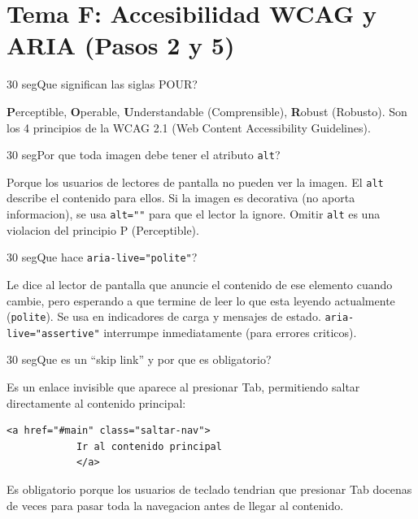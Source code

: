 \documentclass[11pt,a4paper]{article}
\newcounter{nej}
\newcommand{\ej}[2]{%
	\stepcounter{nej}%
	\begin{ejercicio}{\arabic{nej}}{#1}#2\end{ejercicio}\vspace{4pt}}
\begin{document}
	\section{Tema F: Accesibilidad WCAG y ARIA (Pasos 2 y 5)}
	
	\ej{30 seg}{Que significan las siglas POUR?}
	
	\begin{respuesta}
		\textbf{P}erceptible, \textbf{O}perable, \textbf{U}nderstandable (Comprensible), \textbf{R}obust (Robusto). Son los 4 principios de la WCAG 2.1 (Web Content Accessibility Guidelines).
	\end{respuesta}
	\vspace{6pt}
	
	\ej{30 seg}{Por que toda imagen debe tener el atributo \texttt{alt}?}
	
	\begin{respuesta}
		Porque los usuarios de lectores de pantalla no pueden ver la imagen. El \texttt{alt} describe el contenido para ellos. Si la imagen es decorativa (no aporta informacion), se usa \texttt{alt=""} para que el lector la ignore. Omitir \texttt{alt} es una violacion del principio P (Perceptible).
	\end{respuesta}
	\vspace{6pt}
	
	\ej{30 seg}{Que hace \texttt{aria-live="polite"}?}
	
	\begin{respuesta}
		Le dice al lector de pantalla que anuncie el contenido de ese elemento cuando cambie, pero esperando a que termine de leer lo que esta leyendo actualmente (\texttt{polite}). Se usa en indicadores de carga y mensajes de estado. \texttt{aria-live="assertive"} interrumpe inmediatamente (para errores criticos).
	\end{respuesta}
	\vspace{6pt}
	
	\ej{30 seg}{Que es un ``skip link'' y por que es obligatorio?}
	
	\begin{respuesta}
		Es un enlace invisible que aparece al presionar Tab, permitiendo saltar directamente al contenido principal:
		\begin{lstlisting}[style=codehtml]
			<a href="#main" class="saltar-nav">
			Ir al contenido principal
			</a>
		\end{lstlisting}
		Es obligatorio porque los usuarios de teclado tendrian que presionar Tab docenas de veces para pasar toda la navegacion antes de llegar al contenido.
	\end{respuesta}
	\vspace{6pt}
	
\end{document}
